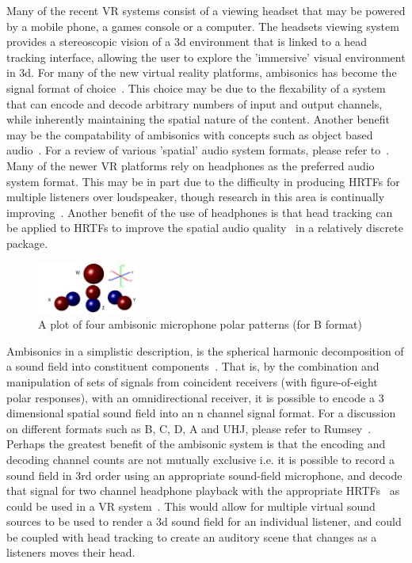 \documentclass[paper=a4, fontsize=10pt, font=arial]{scrartcl} %
\numberwithin{equation}{section} %
\numberwithin{figure}{section} %
\numberwithin{table}{section} %
\begin{document}
Many of the recent VR systems consist of a viewing headset that may be powered by a mobile phone, a games console or a computer. The headsets viewing system provides a stereoscopic vision of a 3d environment that is linked to a head tracking interface, allowing the user to explore the 'immersive' visual environment in 3d. For many of the new virtual reality platforms, ambisonics has become the signal format of choice~\cite{googlevr2016}. This choice may be due to the flexability of a system that can encode and decode arbitrary numbers of input and output channels, while inherently maintaining the spatial nature of the content.
Another benefit may be the compatability of ambisonics with concepts such as object based audio~\cite{Pike2016}. For a review of various 'spatial' audio system formats, please refer to~\cite{Wiggins2004}. Many of the newer VR platforms rely on headphones as the preferred audio system format. This may be in part due to the difficulty in producing HRTFs for multiple listeners over loudspeaker, though research in this area is continually improving~\cite{Galvez2016}. Another benefit of the use of headphones is that head tracking can be applied to HRTFs to improve the spatial audio quality~\cite{Inanaga1995} in a relatively discrete package.\\

\begin{figure}[H]
\centering
\includegraphics[width=0.3\textwidth]{ambisonicmicpatterns.jpg}
\centering
\caption{A plot of four ambisonic microphone polar patterns (for B format)~\cite{Wiggins2004}}
\end{figure}

Ambisonics in a simplistic description, is the spherical harmonic decomposition of a sound field into constituent components~\cite{rumsey2012spatial}. 
That is, by the combination and manipulation of  sets of signals from coincident receivers (with figure-of-eight polar responses), with an omnidirectional receiver, it is possible to encode a 3 dimensional spatial sound field into an n channel signal format. 
For a discussion on different formats such as B, C, D, A and UHJ, please refer to Rumsey~\cite{rumsey2012spatial}. 
Perhaps the greatest benefit of the ambisonic system is that the encoding and decoding channel counts are not mutually exclusive i.e. it is possible to record a sound field in 3rd order using an appropriate sound-field microphone, and decode that signal for two channel headphone playback with the appropriate HRTFs~\cite{Jot1998} as could be used in a VR system~\cite{Collins2013}. This would allow for multiple virtual sound sources to be used to render a 3d sound field for an individual listener, and could be coupled with head tracking to create an auditory scene that changes as a listeners moves their head.\
\end{document}
